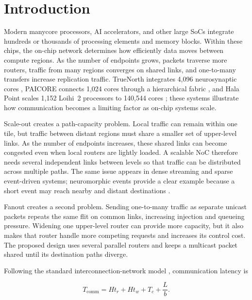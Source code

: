 \documentclass[conference]{IEEEtran}
\begin{document}
\section{Introduction}\label{sec:introduction}

Modern manycore processors, AI accelerators, and other large SoCs integrate
hundreds or thousands of processing elements and memory blocks. Within these
chips, the on-chip network determines how efficiently data moves between
compute regions. As the number of endpoints grows, packets traverse more
routers, traffic from many regions converges on shared links, and one-to-many
transfers increase replication traffic. TrueNorth integrates 4,096 neurosynaptic cores
\cite{merolla2014truenorth}, PAICORE connects 1,024 cores through a
hierarchical fabric \cite{zhong2025paicore}, and Hala Point scales 1,152
Loihi~2 processors to 140,544 cores \cite{intel2021loihi2,intel2024halapoint};
these systems illustrate how communication becomes a limiting factor as
on-chip systems scale.

Scale-out creates a path-capacity problem. Local traffic can remain within one
tile, but traffic between distant regions must share a smaller set of
upper-level links. As the number of endpoints increases, these shared links
can become congested even when local routers are lightly loaded. A scalable
NoC therefore needs several independent links between levels so that traffic
can be distributed across multiple paths. The same issue appears in dense
streaming and sparse event-driven systems; neuromorphic events provide a clear
example because a short event may reach nearby and distant destinations
\cite{moradi2018dynaps,merolla2014tree,su2025hbs}.

Fanout creates a second problem. Sending one-to-many traffic as separate
unicast packets repeats the same flit on common links, increasing injection
and queueing pressure. Widening one upper-level router can provide more
capacity, but it also makes that router handle more competing requests and
increases its control cost. The proposed design uses several parallel routers
and keeps a multicast packet shared until its destination paths diverge.

Following the standard interconnection-network model
\cite{dally2004book,krishna2013smart}, communication latency is

\begin{equation}\label{eq:latency} T_{\mathrm{comm}} = Ht_r + Ht_w + T_c + \frac{L}{b}. \end{equation}
\end{document}
